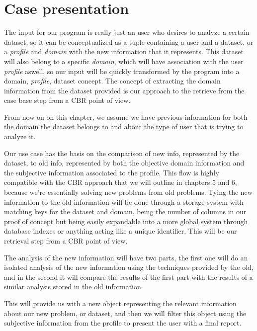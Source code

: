 \section{Case presentation}
\label{cap2:sec:preparation}
The input for our program is really just an user who desires to analyze a certain dataset, so it can be conceptualized as a tuple containing a user and a dataset, or a \textit{profile} and \textit{domain} with the new information that it represents. This dataset will also belong to a specific \textit{domain}, which will have association with the user \textit{profile} aswell, so our input will be quickly transformed by the program into a domain, \textit{profile}, dataset concept. The concept of extracting the domain information from the dataset provided is our approach to the retrieve from the case base step from a CBR point of view.

From now on on this chapter, we assume we have previous information for both the domain the dataset belongs to and about the type of user that is trying to analyze it.

Our use case has the basis on the comparison of new info, represented by the dataset, to old info, represented by both the objective domain information and the subjective information associated to the profile. This flow is highly compatible with the CBR approach that we will outline in chapters 5 and 6, because we're essentially solving new problems from old problems.
Tying the new information to the old information will be done through a storage system with matching keys for the dataset and domain, being the number of columns in our proof of concept but being easily expandable into a more global system through database indexes or anything acting like a unique identifier.
This will be our retrieval step from a CBR point of view.


The analysis of the new information will have two parts, the first one will do an isolated analysis of the new information using the techniques provided by the old, and in the second it will compare the results of the first part with the results of a similar analysis stored in the old information.

This will provide us with a new object representing the relevant information about our new problem, or dataset, and then we will filter this object using the subjective information from the profile to present the user with a final report.

